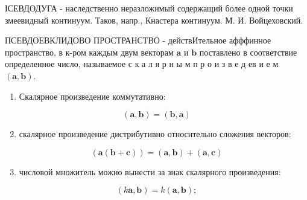 \documentclass[10pt]{article}
\begin{document}
ІСЕВДОДУГА - наследственно неразложимый содержащий более одной точки змеевидный континуум. Таков, напр., Кнастера континуум. М. И. Войцеховский.



ПСЕВДОЕВКЛИДОВО ПРОСТРАНСТВО - действИтельное афффинное пространство, в к-ром каждым двум векторам $\boldsymbol{a}$ и $\boldsymbol{b}$ поставлено в соответствие определенное число, называемое с к а л я р н ы м п р о и з в е д ев и е м $(\boldsymbol{a}, \boldsymbol{b})$.



\begin{enumerate}

  \item Скалярное произведение коммутативно:

\end{enumerate}



\[

(\boldsymbol{a}, \boldsymbol{b})=(\boldsymbol{b}, \boldsymbol{a})

\]



\begin{enumerate}

  \setcounter{enumi}{1}

  \item скалярное произведение дистрибутивно относительно сложения векторов:

\end{enumerate}



\[

(\boldsymbol{a}(\boldsymbol{b}+\boldsymbol{c}))=(\boldsymbol{a}, \boldsymbol{b})+(\boldsymbol{a}, \boldsymbol{c})

\]



\begin{enumerate}

  \setcounter{enumi}{2}

  \item числовой множитель можно вынести за знак скалярного произведения:

\end{enumerate}



\[

(k \boldsymbol{a}, \boldsymbol{b})=k(\boldsymbol{a}, \boldsymbol{b}) ;

\]
\end{document}
